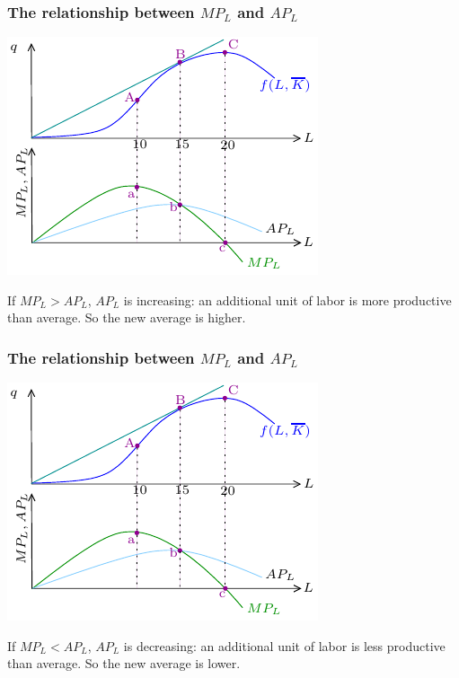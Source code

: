 \documentclass[xcolor=pdftex,dvipsnames]{beamer}
\begin{document}
\begin{frame}
\frametitle{The relationship between $MP_L$ and $AP_L$}
\begin{center}\includegraphics{pics/MPAP}\end{center}
If $MP_L > AP_L$, $AP_L$ is increasing: an additional unit of
labor is more productive than average. So the new average is higher.
\end{frame}


\begin{frame}
\frametitle{The relationship between $MP_L$ and $AP_L$}
\begin{center}\includegraphics{pics/MPAP}\end{center}
If $MP_L < AP_L$, $AP_L$ is decreasing: an additional unit of
labor is less productive than average. So the new average is lower.
\end{frame}
\end{document}
